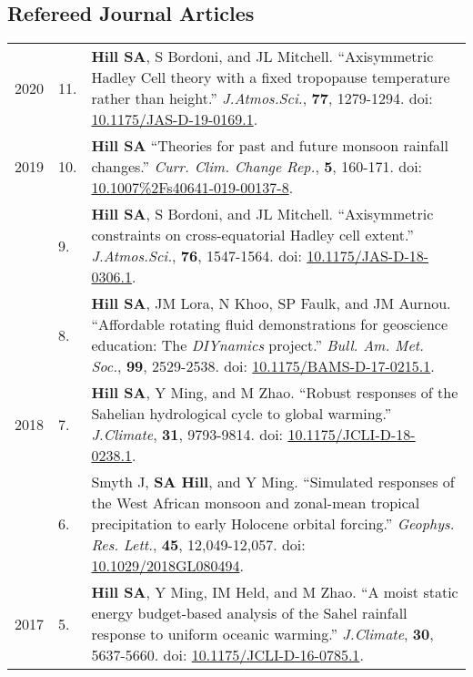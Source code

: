 \documentclass[letterpaper,11pt]{shillcv}
\begin{document}
\subsection*{Refereed Journal Articles}

\begin{longtable}{@{} >{\color{darkgray}} p{} >{\color{black}} p{} @{} p{} @{}}
2020 &  11. & \textbf{Hill SA}, S Bordoni, and JL Mitchell.
``Axisymmetric Hadley Cell theory with a fixed tropopause temperature rather
than height.'' \emph{J.\@ Atmos.\@ Sci.}, \textbf{77}, 1279-1294.  doi: \href{https://doi.org/10.1175/JAS-D-19-0169.1}{10.1175/JAS-D-19-0169.1}.\\
2019 & 10. & \textbf{Hill SA} ``Theories for past and future monsoon rainfall
changes.'' \emph{Curr. Clim. Change Rep.}, \textbf{5}, 160-171.  doi: \href{https://doi.org/10.1007\%2Fs40641-019-00137-8}{10.1007\%2Fs40641-019-00137-8}.\\
     & 9. & \textbf{Hill SA}, S Bordoni, and JL Mitchell.
``Axisymmetric constraints on cross-equatorial Hadley cell extent.''
\emph{J.\@ Atmos.\@ Sci.}, \textbf{76}, 1547-1564.  doi: \href{https://doi.org/10.1175/JAS-D-18-0306.1}{10.1175/JAS-D-18-0306.1}.\\
     & 8. & \textbf{Hill SA}, JM Lora, N Khoo, SP Faulk, and
JM Aurnou.  ``Affordable rotating fluid demonstrations for
geoscience education: The \emph{DIYnamics} project.''  \emph{Bull.
Am. Met. Soc.}, \textbf{99}, 2529-2538.  doi: \href{https://doi.org/10.1175/BAMS-D-17-0215.1}{10.1175/BAMS-D-17-0215.1}.\\
2018 & 7. & \textbf{Hill SA}, Y Ming, and M Zhao.  ``Robust responses of the
Sahelian hydrological cycle to global warming.''  \emph{J.\@ Climate}, \textbf{31}, 9793-9814.  doi: \href{https://doi.org/10.1175/JCLI-D-18-0238.1}{10.1175/JCLI-D-18-0238.1}.\\
     & 6. & Smyth J, \textbf{SA Hill}, and Y Ming.  ``Simulated responses of
the West African monsoon and zonal-mean tropical precipitation to early
Holocene orbital forcing.''  \emph{Geophys. Res. Lett.}, \textbf{45},
12,049-12,057.  doi: \href{https://doi.org/10.1029/2018GL080494}{10.1029/2018GL080494}.\\
2017 & 5. & \textbf{Hill SA}, Y Ming, IM Held, and M Zhao.  ``A moist
static energy budget-based analysis of the Sahel rainfall response to uniform
oceanic warming.''  \emph{J.\@ Climate}, \textbf{30}, 5637-5660.  doi: \href{https://doi.org/10.1175/JCLI-D-16-0785.1}{10.1175/JCLI-D-16-0785.1}.\\

\end{longtable}
\end{document}
